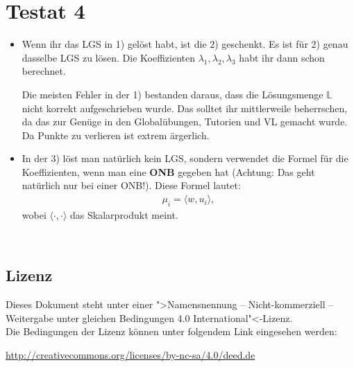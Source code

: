 \documentclass[11pt, a4paper]{article}
\newcommand{\Lsg}{\mathbb{L}}
\begin{document}
\section*{Testat 4}
\begin{itemize}
\item Wenn ihr das LGS in 1) gelöst habt, ist die 2) geschenkt. Es ist für 2) genau dasselbe LGS zu lösen. Die Koeffizienten $\lambda_1, \lambda_2, \lambda_3$ habt ihr dann schon berechnet.

Die meisten Fehler in der 1) bestanden daraus, dass die Lösungsmenge $\Lsg$ nicht korrekt aufgeschrieben wurde. Das solltet ihr mittlerweile beherrschen, da das zur Genüge in den Globalübungen, Tutorien und VL gemacht wurde. Da Punkte zu verlieren ist extrem ärgerlich.

\item In der 3) löst man natürlich kein LGS, sondern verwendet die Formel für die Koeffizienten, wenn man eine \textbf{ONB} gegeben hat (Achtung: Das geht natürlich nur bei einer ONB!). Diese Formel lautet:
\begin{align*}
\mu_i = \langle w, u_i \rangle,
\end{align*}
wobei $\langle \cdot, \cdot \rangle$ das Skalarprodukt meint.


\end{itemize}

\newpage
~
\vfill
{\footnotesize
\subsection*{Lizenz}
Dieses Dokument steht unter einer ">Namensnennung -- Nicht-kommerziell -- Weitergabe unter gleichen Bedingungen 4.0 International"<-Lizenz.\\

\noindent
Die Bedingungen der Lizenz können unter folgendem Link eingesehen werden: 

\noindent
\url{http://creativecommons.org/licenses/by-nc-sa/4.0/deed.de}}
\end{document}
